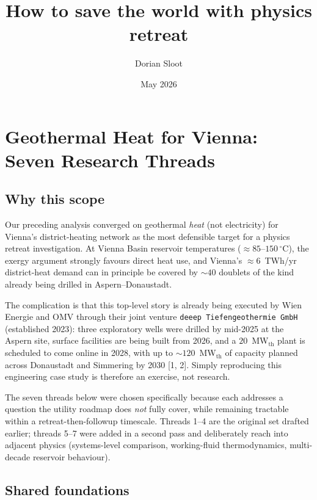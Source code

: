 \documentclass{article}
\title{How to save the world with physics retreat}
\author{Dorian Sloot}
\date{May 2026}
\begin{document}
\maketitle

\section*{Geothermal Heat for Vienna: Seven Research Threads}

\subsection*{Why this scope}

Our preceding analysis converged on geothermal \emph{heat} (not electricity)
for Vienna's district-heating network as the most defensible target for a
physics retreat investigation. At Vienna Basin reservoir temperatures
($\approx 85$--$150\,^\circ$C), the exergy argument strongly favours direct
heat use, and Vienna's $\approx 6$~TWh/yr district-heat demand can in principle
be covered by $\sim 40$ doublets of the kind already being drilled in
Aspern--Donaustadt.

The complication is that this top-level story is already being executed by
Wien Energie and OMV through their joint venture \texttt{deeep Tiefengeothermie
GmbH} (established 2023): three exploratory wells were drilled by mid-2025 at
the Aspern site, surface facilities are being built from 2026, and a $20$~MW$_{\mathrm{th}}$
plant is scheduled to come online in 2028, with up to $\sim 120$~MW$_{\mathrm{th}}$
of capacity planned across Donaustadt and Simmering by 2030 [1, 2]. Simply
reproducing this engineering case study is therefore an exercise, not research.

The seven threads below were chosen specifically because each addresses a
question the utility roadmap does \emph{not} fully cover, while remaining
tractable within a retreat-then-followup timescale. Threads 1--4 are the
original set drafted earlier; threads 5--7 were added in a second pass and
deliberately reach into adjacent physics (systems-level comparison,
working-fluid thermodynamics, multi-decade reservoir behaviour).

\subsection*{Shared foundations}
\end{document}
